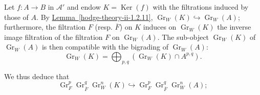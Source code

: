     Let \(f\colon  A\to  B\) in \(\mathscr {A}'\) and endow \(K=\operatorname {Ker}(f)\) with the filtrations induced by those of \(A\).
    By \hyperref[hodge-theory-ii-1.2.11]{Lemma~\ref*{hodge-theory-ii-1.2.11}}, \(\operatorname {Gr}_W(K)\hookrightarrow \operatorname {Gr}_W(A)\);
    furthermore, the filtration \(F\) (resp. \(\overline {F}\)) on \(K\) induces on \(\operatorname {Gr}_W(K)\) the inverse image filtration of the filtration \(F\) on \(\operatorname {Gr}_W(A)\).
    The sub-object \(\operatorname {Gr}_W(K)\) of \(\operatorname {Gr}_W(A)\) is then compatible with the bigrading of \(\operatorname {Gr}_W(A)\):
    \[       \operatorname {Gr}_W(K)       = \bigoplus _{p,q}(\operatorname {Gr}_W(K)\cap  A^{p,q}).     \]\par{}We thus deduce that
    \[       \operatorname {Gr}_F^p\operatorname {Gr}_{\overline {F}}^q\operatorname {Gr}_W^n(K)       \hookrightarrow  \operatorname {Gr}_F^p\operatorname {Gr}_{\overline {F}}^q\operatorname {Gr}_W^n(A);     \]
    
